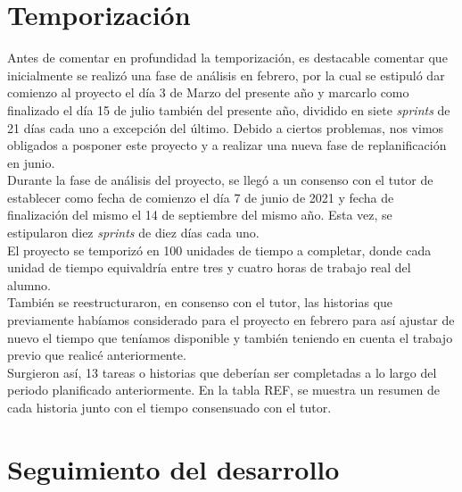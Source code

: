 \section{Temporización}

Antes de comentar en profundidad la temporización, es destacable comentar que inicialmente se realizó una fase de análisis en febrero, por la cual se estipuló dar comienzo al proyecto el día 3 de Marzo del presente año y marcarlo como finalizado el día 15 de julio también del presente año, dividido en siete \textit{sprints} de 21 días cada uno a excepción del último. Debido a ciertos problemas, nos vimos obligados a posponer este proyecto y a realizar una nueva fase de replanificación en junio.\\

Durante la fase de análisis del proyecto, se llegó a un consenso con el tutor de establecer como fecha de comienzo el día 7 de junio de 2021 y fecha de finalización del mismo el 14 de septiembre del mismo año. Esta vez, se estipularon diez \textit{sprints} de diez días cada uno.\\

El proyecto se temporizó en 100 unidades de tiempo a completar, donde cada unidad de tiempo equivaldría entre tres y cuatro horas de trabajo real del alumno.\\

También se reestructuraron, en consenso con el tutor, las historias que previamente habíamos considerado para el proyecto en febrero para así ajustar de nuevo el tiempo que teníamos disponible y también teniendo en cuenta el trabajo previo que realicé anteriormente.\\

Surgieron así, 13 tareas o historias que deberían ser completadas a lo largo del periodo planificado anteriormente. En la tabla REF, se muestra un resumen de cada historia junto con el tiempo consensuado con el tutor.

\section{Seguimiento del desarrollo}
